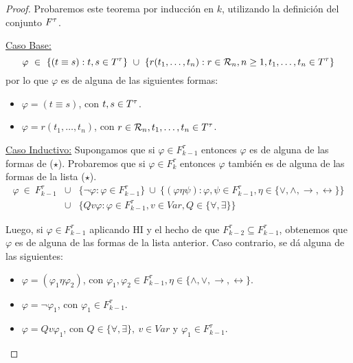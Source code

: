   \begin{proof}
    \PN Probaremos este teorema por inducción en $k$, utilizando la definición del conjunto $F^{\tau}$.

    \vspace{3mm}
    \PN \underline{Caso Base:}
    \[
      \varphi \ \in \ \{(t \equiv s): t, s \in T^{\tau}\} \ \cup \ \{r(t_{1}, \dotsc, t_{n}): r \in \mathcal{R}_{n}, n \geq
      1, t_{1}, \dotsc, t_{n} \in T^{\tau}\}
    \]
    \PN por lo que $\varphi$ es de alguna de las siguientes formas:
    \begin{itemize}
      \item $\varphi = (t \equiv s)$, con $t, s \in T^{\tau}$.
      \item $\varphi = r(t_{1}, \dotsc, t_{n})$, con $r \in \mathcal{R}_{n}, t_{1}, \dotsc, t_{n} \in T^{\tau}$.
    \end{itemize}

    \vspace{3mm}
		\PN \underline{Caso Inductivo:} Supongamos que si $\varphi \in F_{k-1}^{\tau}$ entonces $\varphi$ es de alguna de
    las formas de ($\star$). Probaremos que si $\varphi \in F_{k}^{\tau}$ entonces $\varphi$ también es de alguna de las
    formas de la lista ($\star$).
    \begin{eqnarray*}
      \varphi \ \in \ F_{k-1}^{\tau} &\cup& \{\lnot \varphi: \varphi \in F_{k-1}^{\tau}\} \ \cup \ \{(\varphi \eta \psi):
        \varphi, \psi \in F_{k-1}^{\tau}, \eta \in \{\vee, \wedge, \rightarrow, \leftrightarrow\}\} \\
      &\cup& \{Qv\varphi: \varphi \in F_{k-1}^{\tau}, v \in Var, Q \in \{\forall, \exists\}\}
    \end{eqnarray*}

    \PN Luego, si $\varphi \in F_{k-1}^{\tau}$ aplicando HI y el hecho de que $F_{k-2}^{\tau} \subseteq F_{k-1}^{\tau}$,
    obtenemos que $\varphi$ es de alguna de las formas de la lista anterior. Caso contrario, se dá alguna de las
    siguientes:
    \begin{itemize}
      \item $\varphi = (\varphi_{1} \eta \varphi_{2})$, con $\varphi_{1}, \varphi_{2} \in F_{k-1}^{\tau}, \eta \in
      \{\wedge, \vee, \rightarrow, \leftrightarrow\}$.
      \item $\varphi = \lnot \varphi_{1}$, con $\varphi_{1} \in F_{k-1}^{\tau}$.
      \item $\varphi = Qv\varphi_{1}$, con $Q \in \{\forall, \exists\}, \ v \in Var$ y $\varphi_{1} \in F_{k-1}^{\tau}$.
    \end{itemize}
  \end{proof}

